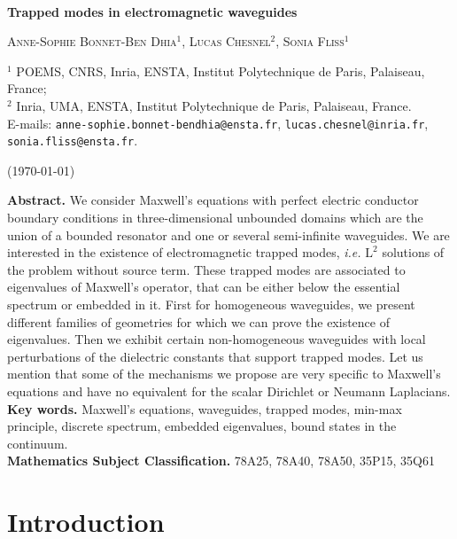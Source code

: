 \documentclass[11pt,a4paper]{article}
\newcommand{\mrm}[1]{\mathrm{#1}}
\newcommand{\mL}{\mrm{L}}
\begin{document}
~\vspace{0.0cm}
\begin{center}
{\sc \bf\huge\selectfont Trapped modes in electromagnetic waveguides}\\[16pt]
\end{center}
\begin{center}
\textsc{Anne-Sophie Bonnet-Ben Dhia}$^1$, \textsc{Lucas Chesnel}$^2$, \textsc{Sonia Fliss}$^1$\\[16pt]
\begin{minipage}{0.97\textwidth}
		{\small
$^1$ POEMS, CNRS, Inria, ENSTA, Institut Polytechnique de Paris, Palaiseau, France;\\
$^2$ Inria, UMA, ENSTA, Institut Polytechnique de Paris, Palaiseau, France.\\[10pt]		
			E-mails: \texttt{anne-sophie.bonnet-bendhia@ensta.fr}, \texttt{lucas.chesnel@inria.fr},  \texttt{sonia.fliss@ensta.fr}.\\[-14pt]
			\begin{center}
				(\today)
			\end{center}
		}
	\end{minipage}
\end{center}
\textbf{Abstract.} We consider Maxwell's equations with perfect electric conductor boundary conditions in three-dimensional unbounded domains which are the union of a bounded resonator and one or several semi-infinite waveguides. We are interested in the existence of electromagnetic trapped modes, \textit{i.e.} $\mL^2$ solutions of the problem without source term. These trapped modes are associated to eigenvalues of Maxwell's operator, that can be either below the essential spectrum or embedded in it. First for homogeneous waveguides, we present different families of geometries for which we can prove the existence of eigenvalues. Then we exhibit certain non-homogeneous waveguides with local perturbations of the dielectric constants that support trapped modes. Let us mention that some of the mechanisms we propose are very specific to Maxwell's equations and have no equivalent for the scalar Dirichlet or Neumann Laplacians.\\[5pt] 
\noindent\textbf{Key words.} Maxwell's equations, waveguides, trapped modes, min-max principle, discrete spectrum, embedded eigenvalues, bound states in the continuum.\\[5pt]
\noindent\textbf{Mathematics Subject Classification.} 78A25, 78A40, 78A50, 35P15, 35Q61

\section{Introduction}
\end{document}
